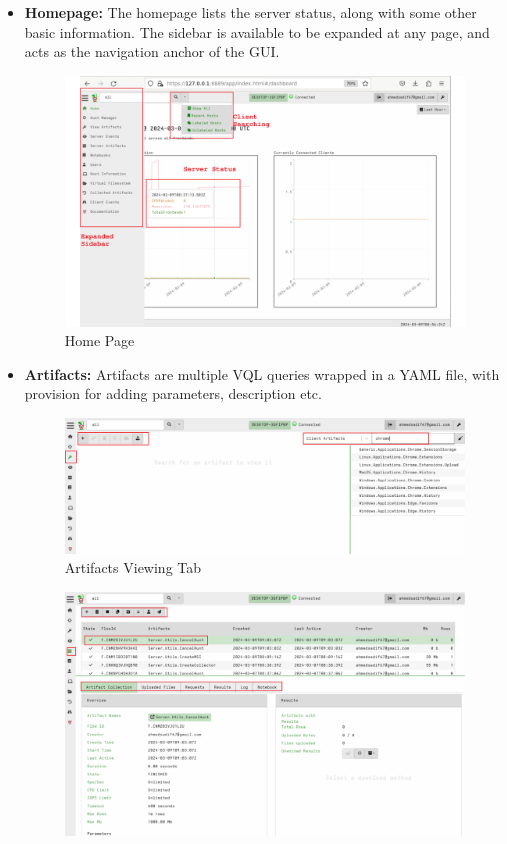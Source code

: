 \documentclass[a4paper, 11pt, oneside]{article} %
\begin{document}
\begin{itemize}
    \item \textbf{Homepage:} The homepage lists the server status, along with some other basic information. The sidebar is available to be expanded at any page, and acts as the navigation anchor of the GUI.
    \begin{figure}[H]
        \centering
        \includegraphics[scale=0.31]{img/GUI/home/1.png}
        \caption{Home Page}
        \label{fig:GUIhome1}
    \end{figure}
    \item  \textbf{Artifacts:} Artifacts are multiple VQL queries wrapped in a YAML file, with provision for adding parameters, description etc.
    \begin{figure}[H]
        \centering
        \includegraphics[scale=0.35]{img/GUI/home/6.png}
        \caption{Artifacts Viewing Tab}
        \label{fig:GUIhome6}
    \end{figure}
    \begin{figure}[H]
        \centering
        \includegraphics[scale=0.35]{img/GUI/home/7.png}

\end{figure}
\end{itemize}
\end{document}
